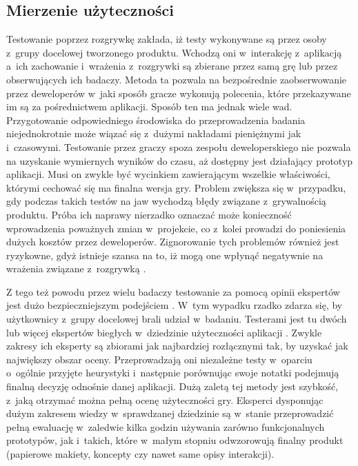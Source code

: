 \documentclass[a4paper,12pt,numbers=noenddot]{report}
\begin{document}
\subsection{Mierzenie użyteczności}
Testowanie poprzez rozgrywkę zakłada, iż testy wykonywane są przez osoby z~grupy docelowej tworzonego produktu\cite{art_evaluatingPlayabilityMG}. Wchodzą oni w~interakcję z~aplikacją a~ich zachowanie i~wrażenia z~rozgrywki są zbierane przez samą grę lub przez obserwujących ich badaczy. Metoda ta pozwala na bezpośrednie zaobserwowanie przez deweloperów w~jaki sposób gracze wykonują polecenia, które przekazywane im są za pośrednictwem aplikacji.
Sposób ten ma jednak wiele wad. Przygotowanie odpowiedniego środowiska do przeprowadzenia badania niejednokrotnie może wiązać się z~dużymi nakładami pieniężnymi jak i~czasowymi. Testowanie przez graczy spoza zespołu deweloperskiego nie pozwala na uzyskanie wymiernych wyników do czasu, aż dostępny jest działający prototyp aplikacji. Musi on zwykle być wycinkiem zawierającym wszelkie właściwości, którymi cechować się ma finalna wersja gry. Problem zwiększa się w~przypadku, gdy podczas takich testów na jaw wychodzą błędy związane z~grywalnością produktu. Próba ich naprawy nierzadko oznaczać może konieczność wprowadzenia poważnych zmian w~projekcie, co z~kolei prowadzi do poniesienia dużych kosztów przez deweloperów. Zignorowanie tych problemów również jest ryzykowne, gdyż istnieje szansa na to, iż mogą one wpłynąć negatywnie na wrażenia związane z~rozgrywką \cite{art_evaluationOfMG}.

Z tego też powodu przez wielu badaczy testowanie za pomocą opinii ekspertów jest dużo bezpieczniejszym podejściem \cite{art_UsabilityTestingComp}. W~tym wypadku rzadko zdarza się, by użytkownicy z~grupy docelowej brali udział w~badaniu. Testerami jest tu dwóch lub więcej ekspertów biegłych w~dziedzinie użyteczności aplikacji \cite{art_Nielsen}. Zwykle zakresy ich eksperty są zbiorami jak najbardziej rozłącznymi tak, by uzyskać jak największy obszar oceny. Przeprowadzają oni niezależne testy w~oparciu o~ogólnie przyjęte heurystyki i~następnie porównując swoje notatki podejmują finalną decyzję odnośnie danej aplikacji.
Dużą zaletą tej metody jest szybkość, z~jaką otrzymać można pełną ocenę użyteczności gry. Eksperci dysponując dużym zakresem wiedzy w~sprawdzanej dziedzinie są w~stanie przeprowadzić pełną ewaluację w~zaledwie kilka godzin używania zarówno funkcjonalnych prototypów, jak i~takich, które w~małym stopniu odwzorowują finalny produkt (papierowe makiety, koncepty czy nawet same opisy interakcji). 
\end{document}
